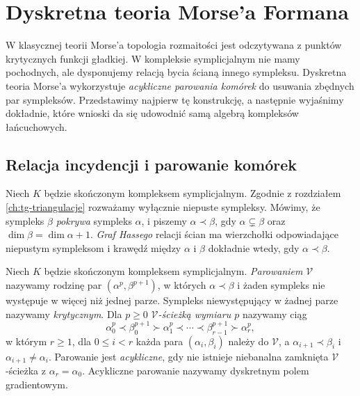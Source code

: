 \chapter{Dyskretna teoria Morse'a Formana}
\label{ch:tg-forman}

W klasycznej teorii Morse'a topologia rozmaitości jest
odczytywana z punktów krytycznych funkcji gładkiej.
W kompleksie symplicjalnym nie mamy pochodnych,
ale dysponujemy relacją bycia ścianą innego sympleksu.
Dyskretna teoria Morse'a wykorzystuje \emph{acykliczne
parowania komórek} do usuwania zbędnych par sympleksów.
Przedstawimy najpierw tę konstrukcję, a następnie
wyjaśnimy dokładnie, które wnioski da się udowodnić
samą algebrą kompleksów łańcuchowych.

\section{Relacja incydencji i parowanie komórek}
\label{sec:tg-forman-matching}

\begin{definicja}
Niech $K$ będzie skończonym kompleksem symplicjalnym.
Zgodnie z rozdziałem \ref{ch:tg-triangulacje} rozważamy
wyłącznie niepuste sympleksy.
Mówimy, że sympleks $\beta$ \emph{pokrywa} sympleks
$\alpha$, i piszemy $\alpha\prec\beta$, gdy
$\alpha\subsetneq\beta$ oraz
$\dim\beta=\dim\alpha+1$. \emph{Graf Hassego}
relacji ścian ma wierzchołki odpowiadające niepustym
sympleksom i krawędź między $\alpha$ i $\beta$
dokładnie wtedy, gdy $\alpha\prec\beta$.
\end{definicja}

\begin{definicja}
\label{def:tg-discrete-morse-field}
Niech $K$ będzie skończonym kompleksem symplicjalnym.
\emph{Parowaniem} $\mathcal V$ nazywamy rodzinę par
$(\alpha^p,\beta^{p+1})$, w których
$\alpha\prec\beta$ i żaden sympleks nie występuje
w więcej niż jednej parze. Sympleks niewystępujący
w żadnej parze nazywamy \emph{krytycznym}.
Dla $p\ge0$ \emph{$\mathcal V$-ścieżką wymiaru $p$}
nazywamy ciąg
\[
\alpha_0^p\prec\beta_0^{p+1}\succ\alpha_1^p
\prec\cdots\prec\beta_{r-1}^{p+1}\succ\alpha_r^p,
\]
w którym $r\ge1$, dla $0\le i<r$ każda para
$(\alpha_i,\beta_i)$ należy do $\mathcal V$,
a $\alpha_{i+1}\prec\beta_i$ i
$\alpha_{i+1}\ne\alpha_i$. Parowanie jest
\emph{acykliczne}, gdy nie istnieje niebanalna
zamknięta $\mathcal V$-ścieżka z
$\alpha_r=\alpha_0$.
Acykliczne parowanie nazywamy dyskretnym polem
gradientowym.
\end{definicja}

